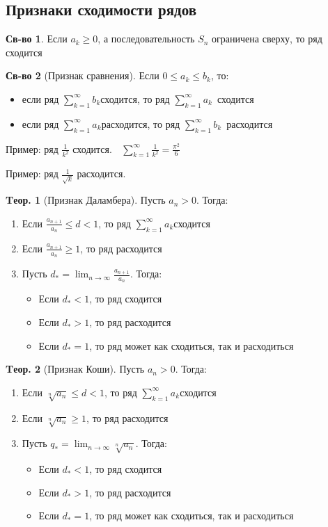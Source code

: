 \documentclass[a4paper,12pt]{article}
\numberwithin{figure}{section}
\theoremstyle{definition}
\newtheorem*{property}{Св-во}  %
\theoremstyle{definition}
\newtheorem{theorem}{Tеор.}[section]
\def\DS{\displaystyle}
\def\ntoinf{n \to \infty}
\def\leqs{\leqslant}
\def\geqs{\geqslant}
\def\rowak{$\DS\sum_{k=1}^{\infty}a_k$}
\def\rowbk{$\DS\sum_{k=1}^{\infty}b_k$}
\begin{document}
\subsection{Признаки сходимости рядов}

\begin{property}
	Если $a_k \geqs 0$, а последовательность $S_n$ ограничена сверху, то ряд сходится
\end{property}

\begin{property}[Признак сравнения]
	Если $0 \leqs a_k \leqs b_k$, то:
	\begin{itemize}
		\item если ряд \rowbk сходится, то ряд \rowak $\,$ сходится
		\item если ряд \rowak расходится, то ряд \rowbk $\,$ расходится
	\end{itemize}
\end{property}

Пример: ряд $\DS\frac1{k^2}$ сходится. $\;$
$\DS\sum_{k=1}^\infty \frac1{k^2} = \frac{\pi^2}6 $

\bigbreak
Пример: ряд $\DS\frac1{\sqrt{k}}$ расходится.

\begin{theorem}[Признак Даламбера]
  Пусть $a_n > 0$. Тогда:
  \begin{enumerate}
	\item Если $\DS\frac{a_{n+1}}{a_n} \leqs d < 1$, то ряд \rowak сходится
	\item Если $\DS\frac{a_{n+1}}{a_n} \geqs 1$, то ряд расходится
	\item Пусть $\DS d_* = \lim_{\ntoinf} \frac{a_{n+1}}{a_n}$. Тогда:
	  \begin{itemize}
	  	\item Если $d_* < 1$, то ряд сходится
	  	\item Если $d_* > 1$, то ряд расходится
	  	\item Если $d_* = 1$, то ряд может как сходиться, так и расходиться
	  \end{itemize}
  \end{enumerate}
\end{theorem}

\begin{theorem}[Признак Коши]
	Пусть $a_n>0$. Тогда:
	\begin{enumerate}
		\item Если $\DS\sqrt[n]{a_n} \leqs d < 1$, то ряд \rowak сходится
		\item Если $\DS\sqrt[n]{a_n} \geqs 1$, то ряд расходится
		\item Пусть $\DS q_* = \lim_{\ntoinf} \sqrt[n]{a_n}$. Тогда:
		\begin{itemize}
			\item Если $d_* < 1$, то ряд сходится
			\item Если $d_* > 1$, то ряд расходится
			\item Если $d_* = 1$, то ряд может как сходиться, так и расходиться
		\end{itemize}
	\end{enumerate}
\end{theorem}
\end{document}
